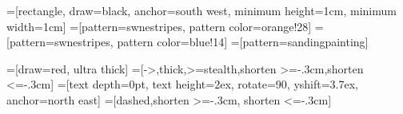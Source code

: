 
 {
	\pgfpoint{0cm}{0cm}
}{
	\pgfpoint{2cm}{2cm}
}{
	\pgfpoint{1cm}{1cm}
}{
		\pgfsetlinewidth{10pt}
		\pgfpathmoveto{\pgfpoint{0cm}{0cm}}
		\pgfpathlineto{\pgfpoint{2cm}{2cm}}
}

 {
	\pgfpoint{0cm}{0cm}
}{
	\pgfpoint{4cm}{4cm}
}{
	\pgfpoint{2cm}{2cm}
}{
		\pgfsetlinewidth{10pt}
		\pgfpathmoveto{\pgfpoint{0cm}{0cm}}
		\pgfpathlineto{\pgfpoint{10cm}{10cm}}
		\pgfpathclose%
		\pgfpathmoveto{\pgfpoint{1cm}{0cm}}
		\pgfpathlineto{\pgfpoint{11cm}{10cm}}
		\pgfpathclose%
}

=[rectangle, draw=black, anchor=south west, minimum height=1cm, minimum width=1cm]
=[pattern=swnestripes, pattern color=orange!28]
=[pattern=swnestripes, pattern color=blue!14]
=[pattern=sandingpainting]

=[draw=red, ultra thick]
=[->,thick,>=stealth,shorten >=-.3cm,shorten <=-.3cm]
=[text depth=0pt, text height=2ex, rotate=90, yshift=3.7ex, anchor=north east]
=[dashed,shorten >=-.3cm, shorten <=-.3cm]